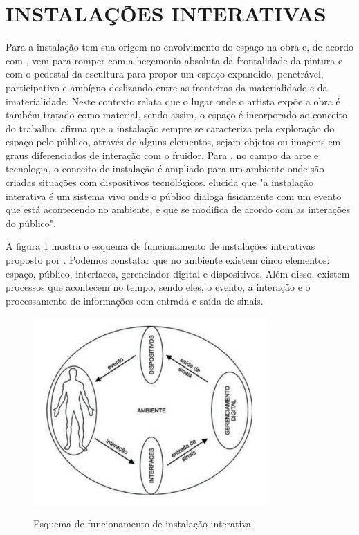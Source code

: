 \section{INSTALAÇÕES INTERATIVAS}

Para  a instalação tem sua origem no envolvimento do espaço na obra e, de acordo com , vem para romper com a hegemonia absoluta da frontalidade da pintura e com o pedestal da escultura para propor um espaço expandido, penetrável, participativo e ambíguo deslizando entre as fronteiras da materialidade e da imaterialidade. Neste contexto  relata que o lugar onde o artista expõe a obra é também tratado como material, sendo assim, o espaço é incorporado ao conceito do trabalho.  afirma que a instalação sempre se caracteriza pela exploração do espaço pelo público, através de alguns elementos, sejam objetos ou imagens em graus diferenciados de interação com o fruidor. Para , no campo da arte e tecnologia, o conceito de instalação é ampliado para um ambiente onde são criadas situações com dispositivos tecnológicos.  elucida que "a instalação interativa é um sistema vivo onde o público dialoga fisicamente com um evento que está acontecendo no ambiente, e que se modifica de acordo com as interações do público".


A figura \ref{fig:instalacoes_interativas} mostra o esquema de funcionamento de instalações interativas proposto por . Podemos constatar que no ambiente existem cinco elementos: espaço, público, interfaces, gerenciador digital e dispositivos. Além disso, existem processos que acontecem no tempo, sendo eles, o evento, a interação e o processamento de informações com entrada e saída de sinais. 

\begin{figure}[H]
    \centering
    \caption{Esquema de funcionamento de instalação interativa}
	\vspace*{0,2cm}
    \includegraphics[width=0.8\textwidth]{./04-figuras/instalacoes_interativas}
    \label{fig:instalacoes_interativas}
\end{figure}
\vspace*{-0,9cm}
{\raggedright {}}\\


